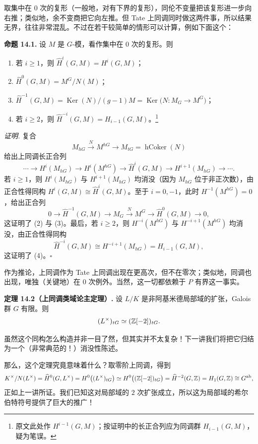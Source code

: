 取集中在 $0$ 次的复形（一般地，对有下界的复形），同伦不变量把该复形进一步向右推；类似地，余不变商把它向左推。但 Tate 上同调同时做这两件事，所以结果无界，往往非常混乱。不过在若干较简单的情形可以计算，例如下面这个：

\textbf{命题 14.1.} 设 $M$ 是 $G$-模，看作集中在 $0$ 次的复形。则
\begin{enumerate}[label=(\arabic*),leftmargin=2.6em,itemsep=1pt,topsep=2pt]
\item 若 $i\ge 1$，则 $\widehat{H}^{i}(G,M)=H^{i}(G,M)$；
\item $\widehat{H}^{0}(G,M)=M^{G}/N(M)$；
\item $\widehat{H}^{-1}(G,M)=\operatorname{Ker}(N)/(g-1)M=\operatorname{Ker}\bigl(N\colon M_{G}\to M^{G}\bigr)$；
\item 若 $i\ge 2$，则 $\widehat{H}^{-i}(G,M)=H_{i-1}(G,M)$。\footnote{原文此处作 $H^{i-1}(G,M)$；按证明中的长正合列应为同调群 $H_{i-1}(G,M)$，疑为笔误。}
\end{enumerate}

\textit{证明.} 复合
\[
M_{hG}\xrightarrow{\ N\ }M^{hG}\to M_{tG}=\operatorname{hCoker}(N)
\]
给出上同调长正合列
\[
\cdots\to H^{i}(M_{hG})\to H^{i}(M^{hG})\to\widehat{H}^{i}(G,M)\to H^{i+1}(M_{hG})\to\cdots.
\]
若 $i\ge 1$，则 $H^{i}(M_{hG})$ 与 $H^{i+1}(M_{hG})$ 均消没（因为 $M_{hG}$ 位于非正次数），由正合性得同构 $H^{i}(G,M)\cong\widehat{H}^{i}(G,M)$。至于 $i=0,-1$，此时 $H^{-1}(M^{hG})=0$，给出正合列
\[
0\to\widehat{H}^{-1}(G,M)\to M_{G}\xrightarrow{\ N\ }M^{G}\to\widehat{H}^{0}(G,M)\to 0,
\]
这证明了 (2) 与 (3)。最后，若 $i\ge 2$，则 $H^{-i}(M^{hG})$ 与 $H^{-i+1}(M^{hG})$ 均消没，由正合性得同构
\[
\widehat{H}^{-i}(G,M)\cong H^{-i+1}(M_{hG})=H_{i-1}(G,M),
\]
这证明了 (4)。\hfill$\square$

作为推论，上同调作为 Tate 上同调出现在更高次，但不在零次；类似地，同调也出现，唯独（关键地）在 $0$ 次例外。当然，这一切都依赖于 $P$ 有界这一事实。

\textbf{定理 14.2（上同调类域论主定理）.} 设 $L/K$ 是非阿基米德局部域的扩张，Galois 群 $G$ 有限。则
\[
(L^{\times})_{tG}\simeq(\mathbb{Z}[-2])_{tG}.
\]

虽然这个同构怎么构造并非一目了然，但其实并不太复杂！下一讲我们将把它归结为一个（非常典范的！）消没性陈述。

那么，这个定理究竟意味着什么？取零阶上同调，得到
\[
K^{\times}/N(L^{\times})=\widehat{H}^{0}(G,L^{\times})=H^{0}\bigl((L^{\times})_{tG}\bigr)\simeq H^{0}\bigl((\mathbb{Z}[-2])_{tG}\bigr)=\widehat{H}^{-2}(G,\mathbb{Z})=H_{1}(G,\mathbb{Z})\cong G^{\mathrm{ab}},
\]
正如上一讲所证。我们已知这对局部域的 $2$ 次扩张成立，所以这为局部域的希尔伯特符号提供了巨大的推广！

